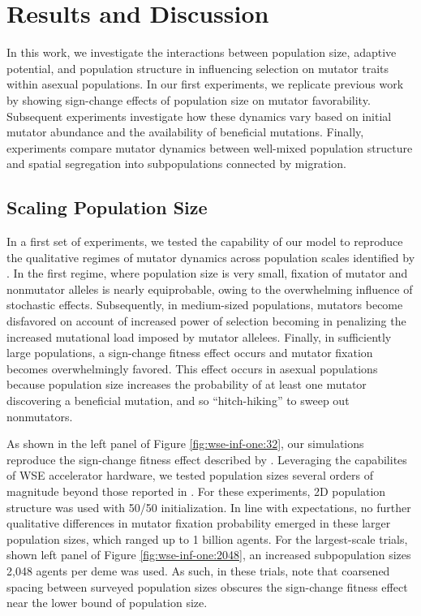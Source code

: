 \section{Results and Discussion} \label{sec:results}

In this work, we investigate the interactions between population size, adaptive potential, and population structure in influencing selection on mutator traits within asexual populations.
In our first experiments, we replicate previous work by \citet{raynes2018sign} showing sign-change effects of population size on mutator favorability.
Subsequent experiments investigate how these dynamics vary based on initial mutator abundance and the availability of beneficial mutations.
Finally, experiments compare mutator dynamics between well-mixed population structure and spatial segregation into subpopulations connected by migration.

\subsection{Scaling Population Size}
\label{sec:scaling-population-size}

In a first set of experiments, we tested the capability of our model to reproduce the qualitative regimes of mutator dynamics across population scales identified by \citet{raynes2018sign}.
In the first regime, where population size is very small, fixation of mutator and nonmutator alleles is nearly equiprobable, owing to the overwhelming influence of stochastic effects.
Subsequently, in medium-sized populations, mutators become disfavored on account of increased power of selection becoming in penalizing the increased mutational load imposed by mutator allelees.
Finally, in sufficiently large populations, a sign-change fitness effect occurs and mutator fixation becomes overwhelmingly favored.
This effect occurs in asexual populations because population size increases the probability of at least one mutator discovering a beneficial mutation, and so ``hitch-hiking'' to sweep out nonmutators.



As shown in the left panel of Figure \ref{fig:wse-inf-one:32}, our simulations reproduce the sign-change fitness effect described by \citet{raynes2018sign}.
Leveraging the capabilites of WSE accelerator hardware, we tested population sizes several orders of magnitude beyond those reported in \citet{raynes2018sign}.
For these experiments, 2D population structure was used with 50/50 initialization.
In line with expectations, no further qualitative differences in mutator fixation probability emerged in these larger population sizes, which ranged up to 1 billion agents.
For the largest-scale trials, shown left panel of Figure \ref{fig:wse-inf-one:2048}, an increased subpopulation sizes 2,048 agents per deme was used.
As such, in these trials, note that coarsened spacing between surveyed population sizes obscures the sign-change fitness effect near the lower bound of population size.


